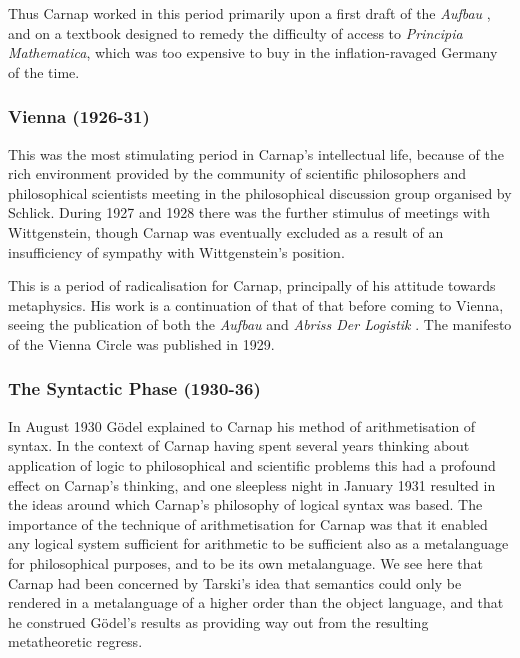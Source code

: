\documentclass[10pt,titlepage]{book}
\def\ouml{\"o}
\begin{document}
Thus Carnap worked in this period primarily upon a first draft of the \emph{Aufbau} \cite{carnap28}, and on a textbook \cite{carnap29} designed to remedy the difficulty of access to \emph{Principia Mathematica}, which was too expensive to buy in the inflation-ravaged Germany of the time.

\subsubsection{Vienna (1926-31)}

This was the most stimulating period in Carnap's intellectual life, because of the rich environment provided by the community of scientific philosophers and philosophical scientists meeting in the philosophical discussion group organised by Schlick.
During 1927 and 1928 there was the further stimulus of meetings with Wittgenstein, though Carnap was eventually excluded as a result of an insufficiency of sympathy with Wittgenstein's position.

This is a period of radicalisation for Carnap, principally of his attitude towards metaphysics.
His work is a continuation of that of that before coming to Vienna, seeing the publication of both the \emph{Aufbau} \cite{carnap28} and \emph{Abriss Der Logistik} \cite{carnap29}.
The manifesto of the Vienna Circle \cite{carnap29b} was published in 1929.

\subsubsection{The Syntactic Phase (1930-36)}

In August 1930 G{\ouml}del explained to Carnap his method of arithmetisation of syntax.
In the context of Carnap having spent several years thinking about application of logic to philosophical and scientific problems this had a profound effect on Carnap's thinking, and one sleepless night in January 1931 resulted in the ideas around which Carnap's philosophy of logical syntax was based.
The importance of the technique of arithmetisation for Carnap was that it enabled any logical system sufficient for arithmetic to be sufficient also as a metalanguage for philosophical purposes, and to be its own metalanguage.
We see here that Carnap had been concerned by Tarski's idea that semantics could only be rendered in a metalanguage of a higher order than the object language, and that he construed G{\ouml}del's results as providing way out from the resulting metatheoretic regress.
\end{document}
